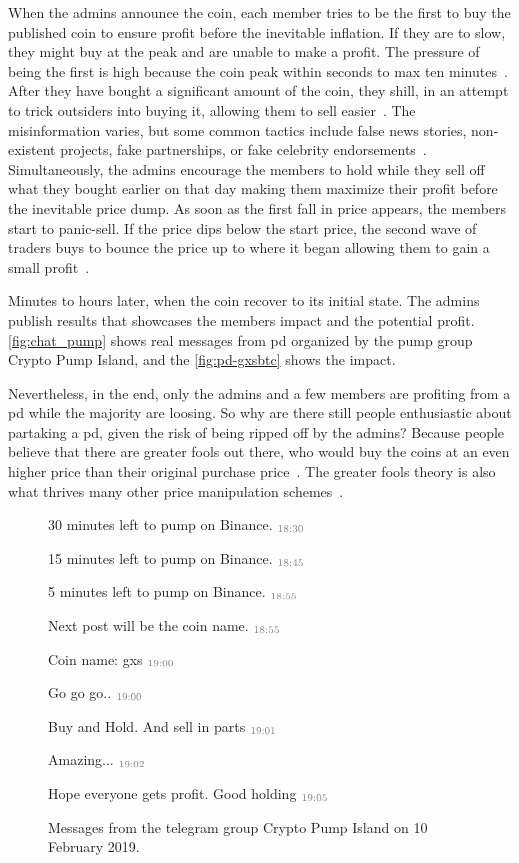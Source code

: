 When the admins announce the coin, each member tries to be the first to buy the published coin to ensure profit before the inevitable inflation. If they are to slow, they might buy at the peak and are unable to make a profit. The pressure of being the first is high because the coin peak within seconds to max ten minutes~\cite{P&D_the_outline, P&D_anatomy}. After they have bought a significant amount of the coin, they shill, in an attempt to trick outsiders into buying it, allowing them to sell easier~\cite{P&D_anatomy}. The misinformation varies, but some common tactics include false news stories, non-existent projects, fake partnerships, or fake celebrity endorsements~\cite{P&D_the_outline}. Simultaneously, the admins encourage the members to hold while they sell off what they bought earlier on that day making them maximize their profit before the inevitable price dump. As soon as the first fall in price appears, the members start to panic-sell. If the price dips below the start price, the second wave of traders buys to bounce the price up to where it began allowing them to gain a small profit~\cite{P&D_anatomy}.

Minutes to hours later, when the coin recover to its initial state. The admins publish results that showcases the members impact and the potential profit. \autoref{fig:chat_pump} shows real messages from \ac{pd} organized by the pump group Crypto Pump Island, and the \autoref{fig:pd-gxsbtc} shows the impact.

Nevertheless, in the end, only the admins and a few members are profiting from a \ac{pd} while the majority are loosing. So why are there still people enthusiastic about partaking a \ac{pd}, given the risk of being ripped off by the admins? Because people believe that there are greater fools out there, who would buy the coins at an even higher price than their original purchase price~\cite{P&D_anatomy}. The greater fools theory is also what thrives many other price manipulation schemes~\cite{dissecting}.
\begin{figure}[ht]
    \begin{leftbubbles}
    30 minutes left to pump on Binance. $\color{gray}_{\text{18:30}}$
    
    15 minutes left to pump on Binance. $\color{gray}_{\text{18:45}}$
    
    5 minutes left to pump on Binance. $\color{gray}_{\text{18:55}}$
    
    Next post will be the coin name. $\color{gray}_{\text{18:55}}$
    
    Coin name: gxs $\color{gray}_{\text{19:00}}$
    
    Go go go.. $\color{gray}_{\text{19:00}}$

    Buy and Hold. And sell in parts $\color{gray}_{\text{19:01}}$
    
    Amazing... $\color{gray}_{\text{19:02}}$
    
    Hope everyone gets profit.
    Good holding $\color{gray}_{\text{19:05}}$
    \end{leftbubbles}
    \caption{Messages from the telegram group Crypto Pump Island on 10 February 2019.}
    \label{fig:chat_pump}
\end{figure}

